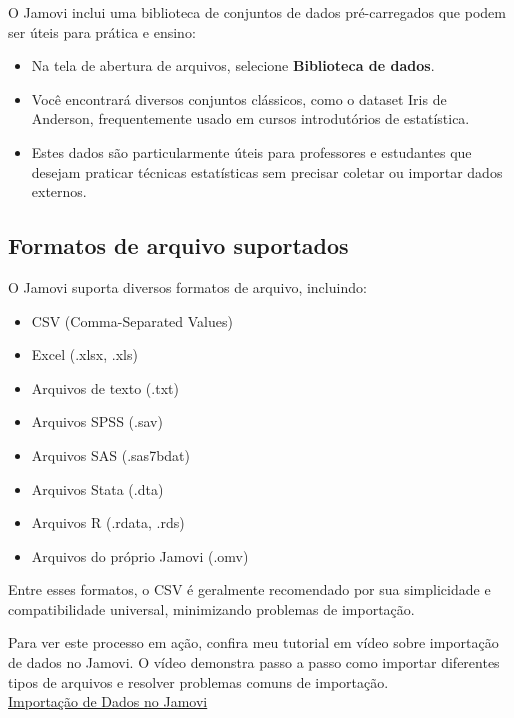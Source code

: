 O Jamovi inclui uma biblioteca de conjuntos de dados pré-carregados que podem ser úteis para prática e ensino:

\begin{itemize}
    \item Na tela de abertura de arquivos, selecione \textbf{Biblioteca de dados}.
    \item Você encontrará diversos conjuntos clássicos, como o dataset Iris de Anderson, frequentemente usado em cursos introdutórios de estatística.
    \item Estes dados são particularmente úteis para professores e estudantes que desejam praticar técnicas estatísticas sem precisar coletar ou importar dados externos.
\end{itemize}

\subsection{Formatos de arquivo suportados}

O Jamovi suporta diversos formatos de arquivo, incluindo:

\begin{itemize}
    \item CSV (Comma-Separated Values)
    \item Excel (.xlsx, .xls)
    \item Arquivos de texto (.txt)
    \item Arquivos SPSS (.sav)
    \item Arquivos SAS (.sas7bdat)
    \item Arquivos Stata (.dta)
    \item Arquivos R (.rdata, .rds)
    \item Arquivos do próprio Jamovi (.omv)
\end{itemize}

Entre esses formatos, o CSV é geralmente recomendado por sua simplicidade e compatibilidade universal, minimizando problemas de importação.

\begin{tcolorbox}[colback=white,colframe=red,title={\faPlayCircle \ Dica de Conteúdo}]
  Para ver este processo em ação, confira meu tutorial em vídeo sobre importação de dados no Jamovi. O vídeo demonstra passo a passo como importar diferentes tipos de arquivos e resolver problemas comuns de importação.\\
  \textcolor{red}{\faYoutube} \href{https://youtu.be/NIpt0wIq5pc?si=IjYrrMqUSNfltmJ9}{Importação de Dados no Jamovi}
\end{tcolorbox}

